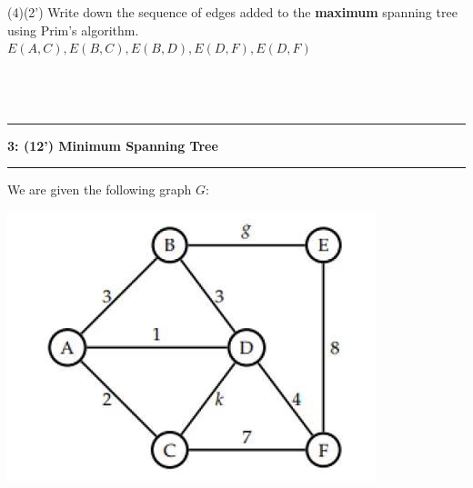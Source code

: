 \documentclass[10.5pt]{article}
\newcommand\question[2]{\vspace{.25in}\hrule\textbf{#1: #2}\vspace{.5em}\hrule\vspace{.10in}}
\begin{document}
(4)(2') Write down the sequence of edges added to the \textbf{maximum} spanning tree using Prim's algorithm.\\
$E(A, C), E(B, C), E(B, D), E(D, F), E(D, F)$\\
\\\\\\

\pagebreak

\question{3}{(12') Minimum Spanning Tree}

We are given the following graph $G$:

\begin{center}\includegraphics[scale=0.4]{3.jpg}
\end{center}
\end{document}
